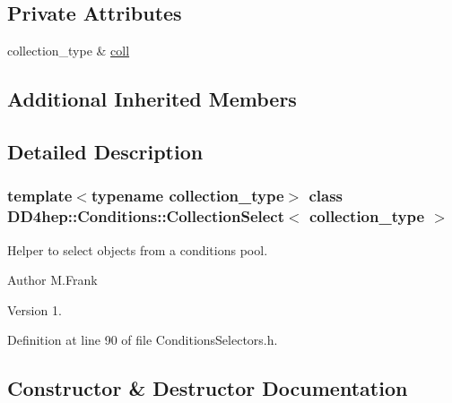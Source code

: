 \subsection*{Private Attributes}
\begin{DoxyCompactItemize}
\item 
collection\+\_\+type \& \hyperlink{class_d_d4hep_1_1_conditions_1_1_collection_select_add9428a8c7577a9d09c7148c4ba1fcd9}{coll}
\end{DoxyCompactItemize}
\subsection*{Additional Inherited Members}


\subsection{Detailed Description}
\subsubsection*{template$<$typename collection\+\_\+type$>$\newline
class D\+D4hep\+::\+Conditions\+::\+Collection\+Select$<$ collection\+\_\+type $>$}

Helper to select objects from a conditions pool. 

\begin{DoxyAuthor}{Author}
M.\+Frank 
\end{DoxyAuthor}
\begin{DoxyVersion}{Version}
1. 
\end{DoxyVersion}


Definition at line 90 of file Conditions\+Selectors.\+h.



\subsection{Constructor \& Destructor Documentation}
\hypertarget{class_d_d4hep_1_1_conditions_1_1_collection_select_a879f557b25aae1cd0608484eb0524929}{}\label{class_d_d4hep_1_1_conditions_1_1_collection_select_a879f557b25aae1cd0608484eb0524929} 
